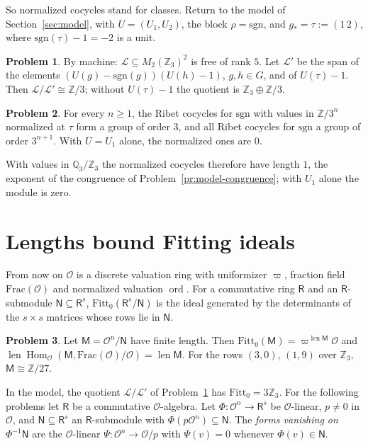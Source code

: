 \documentclass[reqno]{amsart}
\theoremstyle{definition}
\newtheorem{problem}{Problem}[section]
\theoremstyle{plain}
\newcommand{\Z}{\mathbb{Z}}
\newcommand{\Q}{\mathbb{Q}}
\newcommand{\Oc}{\mathcal{O}}
\newcommand{\ord}{\operatorname{ord}}
\newcommand{\len}{\operatorname{len}}
\newcommand{\Fitt}{\mathrm{Fitt}_0}
\newcommand{\Lc}{\mathcal{L}}
\begin{document}
So normalized cocycles stand for classes.  Return to the model of Section~\ref{sec:model}, with \(U = (U_1, U_2)\), the block \(\rho = \mathrm{sgn}\), and \(g_* = \tau := (1\,2)\), where \(\mathrm{sgn}(\tau) - 1 = -2\) is a unit.

\begin{problem}\label{pr:model-lattice}
By machine: \(\Lc \subseteq M_2(\Z_3)^2\) is free of rank \(5\).  Let \(\Lc'\) be the span of the elements \((U(g) - \mathrm{sgn}(g))(U(h) - 1)\), \(g, h \in G\), and of \(U(\tau) - 1\).  Then \(\Lc/\Lc' \cong \Z/3\); without \(U(\tau) - 1\) the quotient is \(\Z_3 \oplus \Z/3\).
\end{problem}

\begin{problem}\label{pr:model-cocycles}
For every \(n \ge 1\), the Ribet cocycles for \(\mathrm{sgn}\) with values in \(\Z/3^n\) normalized at \(\tau\) form a group of order \(3\), and all Ribet cocycles for \(\mathrm{sgn}\) a group of order \(3^{n+1}\).  With \(U = U_1\) alone, the normalized ones are \(0\).
\end{problem}

With values in \(\Q_3/\Z_3\) the normalized cocycles therefore have length \(1\), the exponent of the congruence of Problem~\ref{pr:model-congruence}; with \(U_1\) alone the module is zero.

\section{Lengths bound Fitting ideals}\label{sec:fitting}

From now on \(\Oc\) is a discrete valuation ring with uniformizer \(\varpi\), fraction field \(\mathrm{Frac}(\Oc)\) and normalized valuation \(\ord\).  For a commutative ring \(\mathsf R\) and an \(\mathsf R\)-submodule \(\mathsf N \subseteq \mathsf R^s\), \(\Fitt(\mathsf R^s/\mathsf N)\) is the ideal generated by the determinants of the \(s \times s\) matrices whose rows lie in \(\mathsf N\).

\begin{problem}\label{pr:fitt-length}
Let \(\mathsf M = \Oc^n/\mathsf N\) have finite length.  Then \(\Fitt(\mathsf M) = \varpi^{\len \mathsf M}\Oc\) and \(\len \operatorname{Hom}_{\Oc}(\mathsf M, \mathrm{Frac}(\Oc)/\Oc) = \len \mathsf M\).  For the rows \((3, 0)\), \((1, 9)\) over \(\Z_3\), \(\mathsf M \cong \Z/27\).
\end{problem}

In the model, the quotient \(\Lc/\Lc'\) of Problem~\ref{pr:model-lattice} has \(\Fitt = 3\Z_3\).  For the following problems let \(\mathsf R\) be a commutative \(\Oc\)-algebra.  Let \(\Phi \colon \Oc^n \to \mathsf R^s\) be \(\Oc\)-linear, \(p \ne 0\) in \(\Oc\), and \(\mathsf N \subseteq \mathsf R^s\) an \(\mathsf R\)-submodule with \(\Phi(p\Oc^n) \subseteq \mathsf N\).  The \emph{forms vanishing on \(\Phi^{-1}\mathsf N\)} are the \(\Oc\)-linear \(\Psi \colon \Oc^n \to \Oc/p\) with \(\Psi(v) = 0\) whenever \(\Phi(v) \in \mathsf N\).
\end{document}
